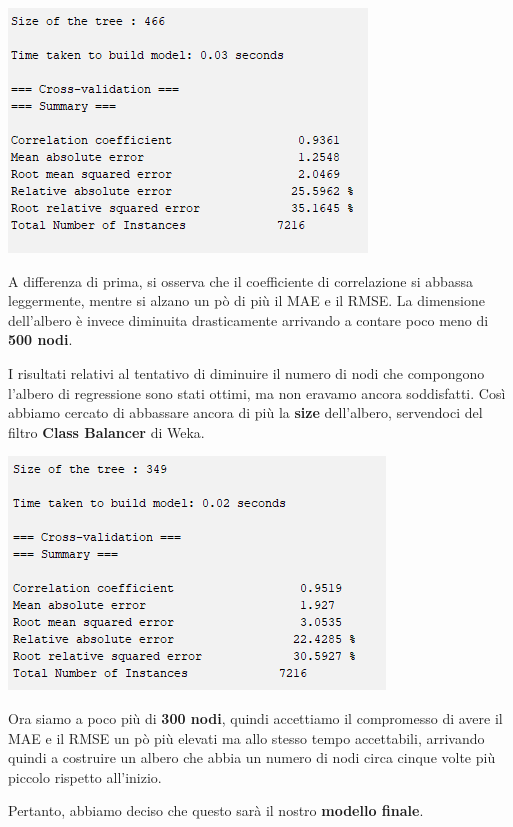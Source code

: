 \documentclass[a4paper, 11pt, oneside]{report}
\begin{document}
                \begin{center}
                    \includegraphics[scale=0.85]{metricheMinNum10}
                \end{center}
                \par \noindent A differenza di prima, si osserva che il coefficiente di correlazione si abbassa leggermente,
                mentre si alzano un pò di più il MAE e il RMSE.
                La dimensione dell'albero è invece diminuita drasticamente arrivando a contare poco meno di \textbf{500 nodi}.
                \\
                \par \noindent I risultati relativi al tentativo di diminuire il numero di nodi che compongono l'albero di
                regressione sono stati ottimi, ma non eravamo ancora soddisfatti.
                Così abbiamo cercato di abbassare ancora di più la \textbf{size} dell'albero, servendoci del
                filtro \textbf{Class Balancer} di Weka.

                \begin{center}
                    \includegraphics[scale=0.85]{metricheDefinitive}
                \end{center}
                \par \noindent Ora siamo a poco più di \textbf{300 nodi}, quindi accettiamo il compromesso di avere il
                MAE e il RMSE un pò più elevati ma allo stesso tempo accettabili,
                arrivando quindi a costruire un albero che abbia un numero di nodi circa cinque volte più piccolo rispetto all'inizio.
                \par \noindent Pertanto, abbiamo deciso che questo sarà il nostro \textbf{modello finale}.
\end{document}
